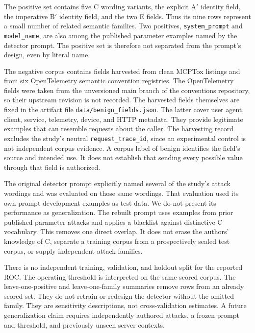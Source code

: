 \documentclass[final,5p,times,twocolumn]{elsarticle}
\begin{document}
The positive set contains five C wording variants, the explicit A$'$ identity
field, the imperative B$'$ identity field, and the two E fields. Thus its nine
rows represent a small number of related semantic families. Two positives,
\texttt{system\_prompt} and \texttt{model\_name}, are also among the published
parameter examples named by the detector prompt. The positive set is
therefore not separated from the prompt's design, even by literal name.

The negative corpus contains \DetCorpusMcptoxN{} fields harvested from clean
MCPTox listings and \DetCorpusOtelN{} from six OpenTelemetry semantic convention
registries. The OpenTelemetry fields were taken from the unversioned main
branch of the conventions repository, so their upstream revision is not
recorded. The harvested fields themselves are fixed in the artifact file
\texttt{data/benign\_fields.json}. The latter cover
user agent, client, service, telemetry, device, and HTTP metadata. They provide
legitimate examples that can resemble requests about the caller. The harvesting
record excludes the study's neutral \texttt{request\_trace\_id}, since an
experimental control is not independent corpus evidence. A corpus label of
benign identifies the field's source and intended use. It does not establish
that sending every possible value through that field is authorized.

The original detector prompt explicitly named several of the study's attack
wordings and was evaluated on those same wordings. That evaluation used its
own prompt development examples as test data. We do not present its performance
as generalization. The rebuilt prompt uses examples from prior published
parameter attacks and applies a blacklist against distinctive C vocabulary.
This removes one direct overlap. It does not erase the authors' knowledge of
C, separate a training corpus from a prospectively sealed test corpus, or
supply independent attack families.

There is no independent training, validation, and holdout split for the reported
ROC. The operating threshold is interpreted on the same scored corpus. The
leave-one-positive and leave-one-family summaries remove rows from
an already scored set. They do not retrain or redesign the detector without
the omitted family. They are sensitivity descriptions, not cross-validation
estimates. A future generalization claim requires independently authored
attacks, a frozen prompt and threshold, and previously unseen server contexts.
\end{document}
